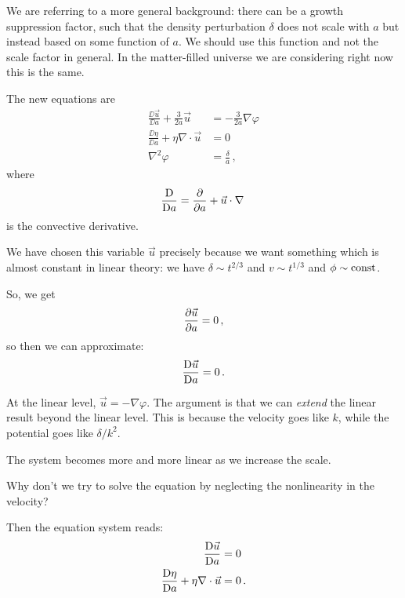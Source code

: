 \documentclass[main.tex]{subfiles}
\begin{document}
We are referring to a more general background: there can be a growth suppression factor, such that the density perturbation \(\delta \) does not scale with \(a\) but instead based on some function of \(a\). 
We should use this function and not the scale factor in general.
In the matter-filled universe we are considering right now this is the same.

The new equations are 
%
\begin{subequations}
\begin{align}
\frac{ \DD \vec{u}}{\DD a} + \frac{3}{2a} \vec{u} &= - \frac{3}{2a} \nabla \varphi  \\
\frac{ \DD \eta }{\DD a} + \eta \nabla \cdot \vec{u} &= 0  \\
\nabla^2 \varphi &= \frac{\delta}{a}
\,,
\end{align}
\end{subequations}
%
where 
%
\begin{align}
\frac{\mathrm{D} }{\mathrm{D} a} = \pdv{}{a} + \vec{u} \cdot \nabla
\,
\end{align}
%
is the convective derivative.

We have chosen this variable \(\vec{u}\) precisely because we want something which is almost constant in linear theory: we have \(\delta \sim t^{2/3}\) and \(v \sim t^{1/3}\) and \(\phi \sim \text{const}\). 

So, we get 
%
\begin{align}
\pdv{\vec{u}}{a} = 0  
\,,
\end{align}
%
so then we can approximate:
%
\begin{align}
\frac{\mathrm{D} \vec{u}}{\mathrm{D} a} = 0 
\,.
\end{align}

At the linear level, \(\vec{u} = - \nabla \varphi \). 
The argument is that we can \emph{extend} the linear result beyond the linear level. This is because the velocity goes like \(k\), while the potential goes like \(\delta / k^2\).

The system becomes more and more linear as we increase the scale.

Why don't we try to solve the equation by neglecting the nonlinearity in the velocity? 

Then the equation system reads: 
%
\begin{subequations}
\begin{align}
\frac{\mathrm{D} \vec{u}}{\mathrm{D} a} &= 0  \\
\frac{\mathrm{D} \eta }{\mathrm{D} a} + \eta \nabla \cdot \vec{u} &= 0 
\,.
\end{align}
\end{subequations}
\end{document}
